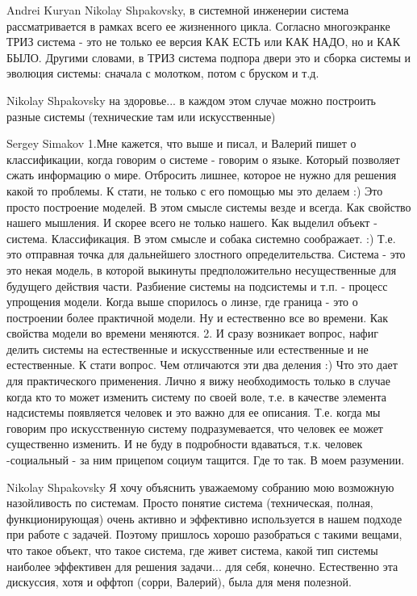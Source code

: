 \documentclass[11pt,a4paper]{article}
\begin{document}
Andrei Kuryan Nikolay Shpakovsky, в системной инженерии система
рассматривается в рамках всего ее жизненного цикла. Согласно многоэкранке ТРИЗ
система - это не только ее версия КАК ЕСТЬ или КАК НАДО, но и КАК
БЫЛО. Другими словами, в ТРИЗ система подпора двери это и сборка системы и
эволюция системы: сначала с молотком, потом с бруском и т.д.

Nikolay Shpakovsky на здоровье...  в каждом этом случае можно построить разные
системы (технические там или искусственные)

Sergey Simakov 1.Мне кажется, что выше и писал, и Валерий пишет о
классификации, когда говорим о системе - говорим о языке. Который позволяет
сжать информацию о мире. Отбросить лишнее, которое не нужно для решения какой
то проблемы. К стати, не только с его помощью мы это делаем :) Это просто
построение моделей.  В этом смысле системы везде и всегда. Как свойство нашего
мышления. И скорее всего не только нашего. Как выделил объект -
система. Классификация. В этом смысле и собака системно соображает. :)
Т.е. это отправная точка для дальнейшего злостного определительства. Система -
это это некая модель, в которой выкинуты предположительно несущественные для
будущего действия части. Разбиение системы на подсистемы и т.п. - процесс
упрощения модели. Когда выше спорилось о линзе, где граница - это о построении
более практичной модели. Ну и естественно все во времени. Как свойства модели
во времени меняются.  2. И сразу возникает вопрос, нафиг делить системы на
естественные и искусственные или естественные и не естественные. К стати
вопрос. Чем отличаются эти два деления :) Что это дает для практического
применения.  Лично я вижу необходимость только в случае когда кто то может
изменить систему по своей воле, т.е. в качестве элемента надсистемы появляется
человек и это важно для ее описания.  Т.е. когда мы говорим про искусственную
систему подразумевается, что человек ее может существенно изменить. И не буду
в подробности вдаваться, т.к. человек -социальный - за ним прицепом социум
тащится.  Где то так. В моем разумении.

Nikolay Shpakovsky Я хочу объяснить уважаемому собранию мою возможную
назойливость по системам. Просто понятие система (техническая, полная,
функционирующая) очень активно и эффективно используется в нашем подходе при
работе с задачей.  Поэтому пришлось хорошо разобраться с такими вещами, что
такое объект, что такое система, где живет система, какой тип системы наиболее
эффективен для решения задачи... для себя, конечно.  Естественно эта
дискуссия, хотя и оффтоп (сорри, Валерий), была для меня полезной.
\end{document}
